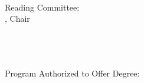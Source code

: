 \begin{titlepage}
    \begin{center}
        \large

        \hfill

        \vfill

        \begingroup
            \color{CTtitle}\spacedallcaps{\myTitle} \\ \bigskip
        \endgroup

        \spacedlowsmallcaps{\myName} \\ \bigskip \bigskip \bigskip \bigskip
        \bigskip \bigskip

        \mySubtitle \\ \medskip
        \myDegree \\ \medskip
        \myUni \\
        \myTime \\  \bigskip \bigskip \bigskip \bigskip
        \bigskip \bigskip

        Reading Committee: \\ \medskip
        \myChair, Chair \\ \medskip
        \myOtherFaculty\\ \medskip
        \myFaculty \\  \medskip
        \myOtherOtherFaculty \\ \bigskip \bigskip \bigskip \bigskip
        \bigskip \bigskip

        Program Authorized to Offer Degree: \\ \medskip
        \myDepartment \\

        \vfill

    \end{center}
\end{titlepage}
